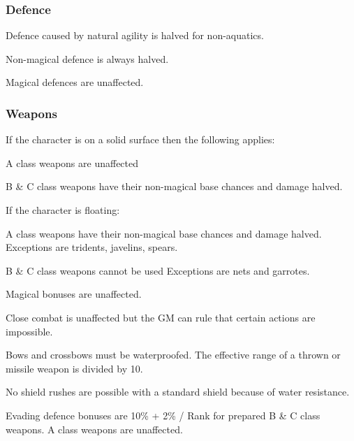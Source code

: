 \begin{multicols*}{3}
\subsubsection{Defence}
\begin{Itemize}
\item Defence caused by natural agility is halved for non-aquatics.
\item Non-magical defence is always halved.
\item Magical defences are unaffected.
\end{Itemize}

\subsubsection{Weapons}
If the character is on a solid surface then the following applies:
\begin{Itemize}
\item A class weapons are unaffected
\item B \& C class weapons have their non-magical base chances and damage halved.
\end{Itemize}

If the character is floating:
\begin{Itemize}
\item A class weapons have their non-magical base chances and damage halved.
Exceptions are tridents, javelins, spears.
\item B \& C class weapons cannot be used  Exceptions are nets and garrotes.
\end{Itemize}

Magical bonuses are unaffected.

Close combat is unaffected but the GM can rule that certain actions
are impossible.

Bows and crossbows must be waterproofed. The effective range of a thrown or
missile weapon is divided by 10.

No shield rushes are possible with a standard shield because of water
resistance.

Evading defence bonuses are 10\% + 2\% / Rank for prepared B \& C
class weapons. A class weapons are unaffected.

\end{multicols*}
